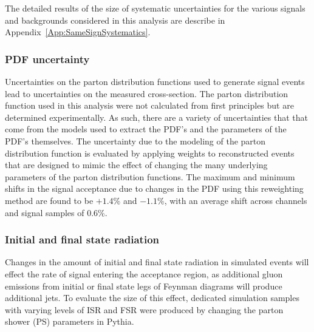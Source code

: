 The detailed results of the size of systematic uncertainties for the various signals and backgrounds
considered in this analysis are describe in Appendix~\ref{App:SameSignSystematics}.

\subsubsection{PDF uncertainty}
Uncertainties on the parton distribution functions used to generate signal events lead to uncertainties on the measured cross-section.
The parton distribution function used in this analysis were not calculated from first principles but are determined experimentally.
As such, there are a variety of uncertainties that that come from the models used to extract the PDF's
and the parameters of the PDF's themselves.
The uncertainty due to the modeling of the parton distribution function is evaluated by applying weights to reconstructed events
that are designed to mimic the effect of changing the many underlying parameters of the parton distribution functions.
The maximum and minimum shifts in the signal acceptance due to changes in the PDF using this reweighting method
are found to be $+1.4$\% and $-1.1$\%, with an average shift across channels and signal samples of 0.6\%.


\subsubsection{Initial and final state radiation}
Changes in the amount of initial and final state radiation in simulated events will
effect the rate of signal entering the acceptance region, as additional gluon
emissions from initial or final state legs of Feynman diagrams will produce
additional jets.
To evaluate the size of this effect, dedicated simulation samples with varying levels of
ISR and FSR were produced by changing the parton shower (PS) parameters in Pythia.

